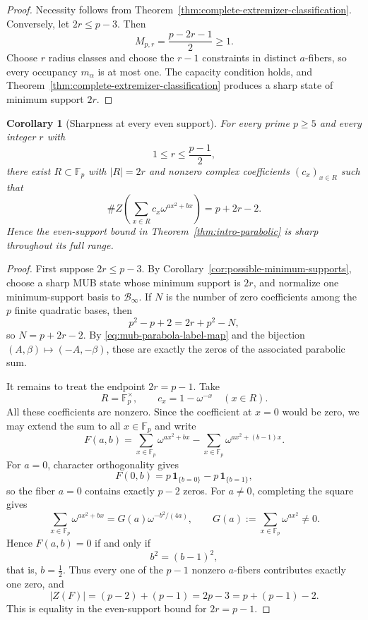 \documentclass[11pt]{article}
\newtheorem{corollary}[theorem]{Corollary}
\newcommand{\F}{\mathbb F}
\begin{document}
\begin{proof}
Necessity follows from
Theorem~\ref{thm:complete-extremizer-classification}.  Conversely, let
\(2r\le p-3\).  Then
\[
 M_{p,r}=\frac{p-2r-1}{2}\ge1.
\]
Choose \(r\) radius classes and choose the \(r-1\) constraints in
distinct \(a\)-fibers, so every occupancy \(m_\alpha\) is at most one.
The capacity condition holds, and
Theorem~\ref{thm:complete-extremizer-classification} produces a sharp
state of minimum support \(2r\).
\end{proof}

\begin{corollary}[Sharpness at every even support]
\label{cor:even-parabolic-sharpness}
For every prime $p\ge5$ and every integer \(r\) with
\[
 1\le r\le\frac{p-1}{2},
\]
there exist $R\subset\mathbb F_p$ with $|R|=2r$ and nonzero complex
coefficients $(c_x)_{x\in R}$ such that
\[
 \#Z\!\left(\sum_{x\in R}c_x\omega^{ax^2+bx}\right)=p+2r-2.
\]
Hence the even-support bound in Theorem~\ref{thm:intro-parabolic} is sharp
throughout its full range.
\end{corollary}

\begin{proof}
First suppose \(2r\le p-3\).  By
Corollary~\ref{cor:possible-minimum-supports}, choose a sharp MUB state whose
minimum support is \(2r\), and normalize one minimum-support basis to
\(\mathcal B_\infty\).  If \(N\) is the number of zero coefficients among
the \(p\) finite quadratic bases, then
\[
 p^2-p+2=2r+p^2-N,
\]
so \(N=p+2r-2\).  By \eqref{eq:mub-parabola-label-map} and the bijection
\((A,\beta)\mapsto(-A,-\beta)\), these are exactly the zeros of the
associated parabolic sum.

It remains to treat the endpoint \(2r=p-1\).  Take
\[
 R=\F_p^\times,
 \qquad
 c_x=1-\omega^{-x}\quad(x\in R).
\]
All these coefficients are nonzero.  Since the coefficient at \(x=0\)
would be zero, we may extend the sum to all \(x\in\F_p\) and write
\[
 F(a,b)
 =
 \sum_{x\in\F_p}\omega^{ax^2+bx}
 -
 \sum_{x\in\F_p}\omega^{ax^2+(b-1)x}.
\]
For \(a=0\), character orthogonality gives
\[
 F(0,b)=p\,\mathbf 1_{\{b=0\}}-p\,\mathbf 1_{\{b=1\}},
\]
so the fiber \(a=0\) contains exactly \(p-2\) zeros.  For \(a\ne0\),
completing the square gives
\[
 \sum_{x\in\F_p}\omega^{ax^2+bx}
 =
 G(a)\omega^{-b^2/(4a)},
 \qquad
 G(a):=\sum_{x\in\F_p}\omega^{ax^2}\ne0.
\]
Hence \(F(a,b)=0\) if and only if
\[
 b^2=(b-1)^2,
\]
that is, \(b=\tfrac12\).  Thus every one of the \(p-1\) nonzero
\(a\)-fibers contributes exactly one zero, and
\[
 |Z(F)|=(p-2)+(p-1)=2p-3=p+(p-1)-2.
\]
This is equality in the even-support bound for \(2r=p-1\).
\end{proof}
\end{document}
